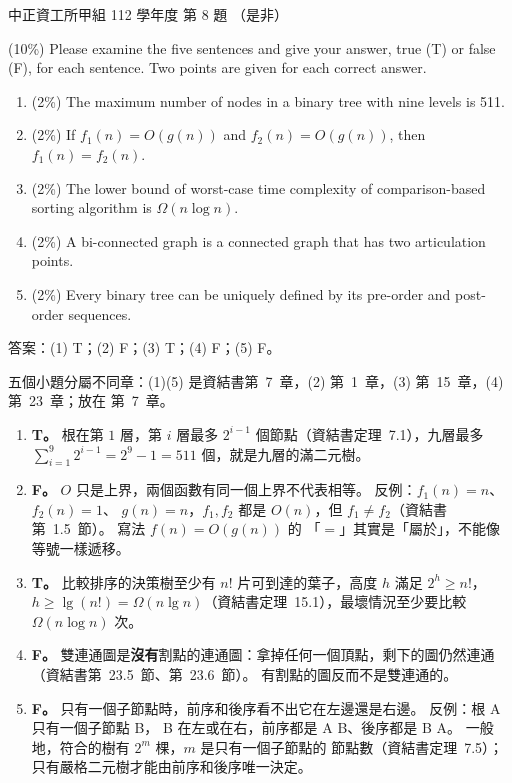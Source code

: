 \begin{pastexam}[label={px:ccu-112-swa-01}]{中正資工所甲組 112 學年度 第 8 題}
（是非）

(10\%) Please examine the five sentences and give your answer, true (T) or false (F), for each
sentence. Two points are given for each correct answer.
\begin{enumerate}[label=(\arabic*)]
\item (2\%) The maximum number of nodes in a binary tree with nine levels is 511.
\item (2\%) If $f_1(n)=O(g(n))$ and $f_2(n)=O(g(n))$, then $f_1(n)=f_2(n)$.
\item (2\%) The lower bound of worst-case time complexity of comparison-based sorting algorithm is
$\Omega(n\log n)$.
\item (2\%) A bi-connected graph is a connected graph that has two articulation points.
\item (2\%) Every binary tree can be uniquely defined by its pre-order and post-order sequences.
\end{enumerate}
\end{pastexam}

\begin{pastsoln}
答案：(1) T；(2) F；(3) T；(4) F；(5) F。

五個小題分屬不同章：(1)(5) 是資結書第~7~章，(2) 第~1~章，(3) 第~15~章，(4) 第~23~章；放在
第~7~章。
\begin{enumerate}[label=(\arabic*)]
\item \textbf{T。} 根在第 $1$ 層，第 $i$ 層最多 $2^{i-1}$ 個節點（資結書定理~7.1），九層最多
$\sum_{i=1}^{9} 2^{i-1} = 2^9 - 1 = 511$ 個，就是九層的滿二元樹。
\item \textbf{F。} $O$ 只是上界，兩個函數有同一個上界不代表相等。 反例：$f_1(n) = n$、$f_2(n) = 1$、
$g(n) = n$，$f_1, f_2$ 都是 $O(n)$，但 $f_1 \ne f_2$（資結書第~1.5~節）。 寫法 $f(n) = O(g(n))$ 的
「$=$」其實是「屬於」，不能像等號一樣遞移。
\item \textbf{T。} 比較排序的決策樹至少有 $n!$ 片可到達的葉子，高度 $h$ 滿足 $2^h \ge n!$，
$h \ge \lg(n!) = \Omega(n \lg n)$（資結書定理~15.1），最壞情況至少要比較 $\Omega(n \log n)$ 次。
\item \textbf{F。} 雙連通圖是\textbf{沒有}割點的連通圖：拿掉任何一個頂點，剩下的圖仍然連通
（資結書第~23.5~節、第~23.6~節）。 有割點的圖反而不是雙連通的。
\item \textbf{F。} 只有一個子節點時，前序和後序看不出它在左邊還是右邊。 反例：根 A 只有一個子節點 B，
B 在左或在右，前序都是 A B、後序都是 B A。 一般地，符合的樹有 $2^m$ 棵，$m$ 是只有一個子節點的
節點數（資結書定理~7.5）；只有嚴格二元樹才能由前序和後序唯一決定。
\end{enumerate}
\end{pastsoln}
